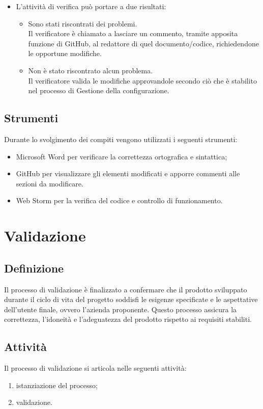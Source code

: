 \begin{itemize}
\begin{itemize}
\begin{enumerate}
        \end{enumerate}
    \end{itemize}
    \item L'attività di verifica può portare a due risultati:
    \begin{itemize}
        \item Sono stati riscontrati dei problemi.\\
        Il verificatore è chiamato a lasciare un commento, tramite apposita funzione di GitHub, al redattore di quel documento/codice, richiedendone le opportune modifiche.
        \item Non è stato riscontrato alcun problema.\\
        Il verificatore valida le modifiche approvandole secondo ciò che è stabilito nel processo di Gestione della configurazione.
    \end{itemize}
\end{itemize}

\subsection{Strumenti}
Durante lo svolgimento dei compiti vengono utilizzati i seguenti strumenti:
\begin{itemize}
    \item Microsoft Word per verificare la correttezza ortografica e sintattica;
    \item GitHub per visualizzare gli elementi modificati e apporre commenti alle sezioni da modificare.
    \item Web Storm per la verifica del codice e controllo di funzionamento.
\end{itemize}
\newpage

\section{Validazione} \label{sec:validazione}
\subsection{Definizione}
Il processo di validazione è finalizzato a confermare che il prodotto sviluppato durante il ciclo di vita del progetto soddisfi le esigenze specificate e le aspettative dell'utente finale, ovvero l'azienda proponente. Questo processo assicura la correttezza, l'idoneità e l'adeguatezza del prodotto rispetto ai requisiti stabiliti.
\subsection{Attività}
Il processo di validazione si articola nelle seguenti attività:
\begin{enumerate}
    \item istanziazione del processo;
    \item validazione.
\end{enumerate}
